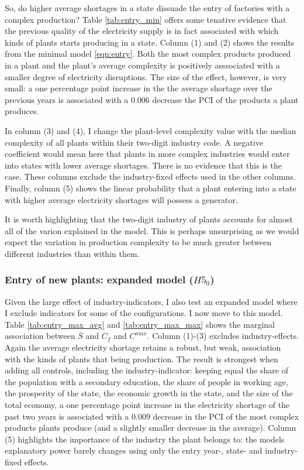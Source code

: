 \documentclass[11pt]{article}
\begin{document}
So, do higher average shortages in a state dissuade the entry of factories with a complex production? Table \ref{tab:entry_min} offers some tenative evidence that the previous quality of the electricity supply is in fact associated with which kinds of plants starts producing in a state. Column (1) and (2) shows the results from the minimal model \ref{eqn:entry}. Both the most complex products produced in a plant and the plant's average complexity is positively asssociated with a smaller degree of electricity disruptions. The size of the effect, however, is very small: a one percentage point increase in the the average shortage over the previous years is associated with a 0.006 decrease the PCI of the products a plant produces.

In column (3) and (4), I change the plant-level complexity value with the median complexity of all plants within their two-digit industry code. A negative coefficient would mean here that plants in more complex industries would enter into states with lower average shortages. There is no evidence that this is the case. These columns exclude the industry-fixed effects used in the other columns. Finally, column (5) shows the linear probability that a plant entering into a state with higher average electricity shortages will possess a generator.

It is worth highlighting that the two-digit industry of plants accounts for almost all of the varion explained in the model. This is perhaps unsurprising as we would expect the variation in production complexity to be much greater between different industries than within them. 

\subsubsection{Entry of new plants: expanded model ($H5_0$)}
Given the large effect of industry-indicators, I also test an expanded model where I exclude indicators for some of the configurations. I now move to this model. Table \ref{tab:entry_max_avg} and \ref{tab:entry_max_max} shows the marginal association between $\bar{S}$ and $C_f$ and $C^{max}$. Column (1)-(3) excludes industry-effects. Again the average electricity shortage retains a robust, but weak, association with the kinds of plants that being production. The result is strongest when adding all controls, including the industry-indicator: keeping equal the share of the population with a secondary education, the share of people in working age, the prosperity of the state, the economic growth in the state, and the size of the total economy, a one percentage point increase in the electricity shortage of the past two years is associated with a 0.009 decrease in the PCI of the most complex products plants produce (and a slightly smaller decrease in the average). Column (5) highlights the importance of the industry the plant belongs to: the models explanatory power barely changes using only the entry year-, state- and industry-fixed effects.
\end{document}
